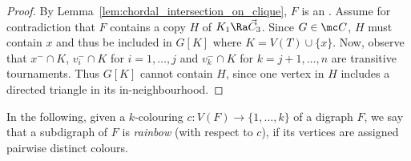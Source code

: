 \begin{proof}
By Lemma~\ref{lem:chordal_intersection_on_clique}, $F$ is an \ocg. Assume for contradiction that $F$ contains a copy $H$ of $K_1 \Ra \vec C_3$. Since $G \in \mc C$, $H$ must contain $x$ and thus be included in $G[K]$ where $K=V(T) \cup \{x\}$. Now, observe that $x^- \cap K$, $v_i^- \cap K$ for $i=1, \dots, j$ and $v_k^- \cap K$ for $k=j+1, \dots, n$ are transitive tournaments. Thus $G[K]$ cannot contain $H$, since one vertex in $H$ includes a directed triangle in its in-neighbourhood.  
\end{proof}

In the following, given a $k$-colouring $c:V(F) \rightarrow \{1,\ldots,k\}$ of a digraph $F$, we say that a subdigraph of $F$ is \emph{rainbow} (with respect to $c$), if its vertices are assigned pairwise distinct colours. 

